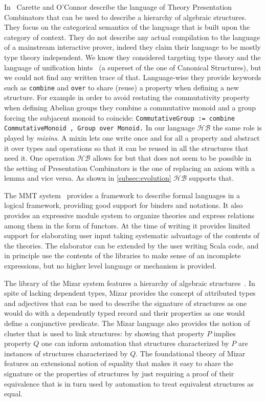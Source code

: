 \documentclass[a4paper,UKenglish,cleveref, autoref]{lipics-v2019}
\newcommand{\HB}{\ensuremath{\mathcal{HB}}}
\newcommand{\mixin}{mixin}
\newcommand{\mixins}{mixins}
\theoremstyle{implem}
\theoremstyle{implem}
\theoremstyle{command}
\begin{document}
{{In~\cite{CaretteCombinators} Carette and O'Connor describe the language of
Theory Presentation Combinators that can be used to describe a hierarchy of
algebraic structures.
They focus on the categorical semantics of the language that is built upon
the category of context.
They do not describe any actual compilation to the language of a mainstream
interactive prover, indeed they claim their language to be mostly type theory
independent. We know they considered targeting type theory and the language
of unification hints~\cite{10.1007/978-3-642-03359-9_8}
(a superset of the one of Canonical Structures),
but we could not find any written trace of that. Language-wise they provide
keywords such as \verb+combine+ and \verb+over+ to share (reuse) a property
when defining a new structure. For example in order to avoid restating
the commutativity property when defining Abelian groups they combine
a commutative monoid and a group forcing the subjacent monoid to coincide: %
\verb-CommutativeGroup := combine CommutativeMonoid , Group over Monoid.-
In our language \HB{} the same role is played by \emph{\mixins{}}.
A \mixin{} lets one write once and for all a property and abstract it over types
and operations so that it can be reused in all the structures that need it.
One operation \HB{} allows for but that does not seem to be possible in the
setting of Presentation Combinators is the one of replacing an axiom with a
lemma and vice versa. As shown in \autoref{subsec:evolution} \HB{} supports
that.

The MMT system~\cite{RABE20131} provides a framework to describe formal
languages in a logical framework, providing good support for binders and
notations. It also provides an expressive module system to organize
theories and express relations among them in the form of functors.
At the time of writing
it provides limited support for elaborating user input taking systematic
advantage of the contents of the theories. The elaborator can be extended
by the user writing Scala code, and in principle use the contents of the
libraries to make sense of an incomplete expressions, but no higher level
language or mechanism is provided.

The library of the Mizar system features a hierarchy of algebraic
structures~\cite{7733265}. In spite of lacking dependent types, Mizar
provides the concept of attributed types and adjectives
that can be used to describe the signature of structures as one would
do with a dependently typed record and their properties as
one would define a conjunctive predicate.
The Mizar language also provides the notion of cluster that is used
to link structures: by showing that property $P$ implies property $Q$
one can inform automation that structures characterized by $P$ are
instances of structures characterized by $Q$. The foundational theory of Mizar
features an extensional notion of equality that makes it easy
to share the signature or the properties of structures by just requiring
a proof of their equivalence that is in turn used by automation to treat
equivalent structures as equal.

}}
\end{document}
